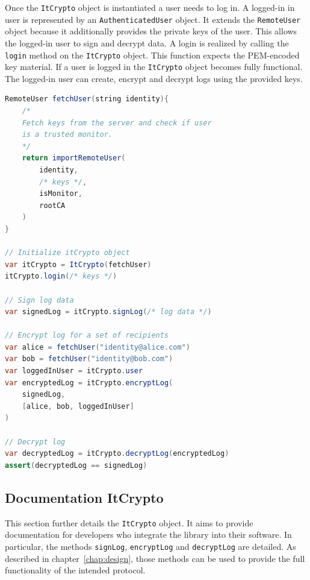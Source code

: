 \documentclass[../main.tex]{subfiles}
\begin{document}
Once the \verb|ItCrypto| object is instantiated a user needs to log in.
A logged-in in user is represented by an \verb|AuthenticatedUser| object.
It extends the \verb|RemoteUser| object because it additionally provides the private keys of the user.
This allows the logged-in user to sign and decrypt data.
A login is realized by calling the \verb|login| method on the \verb|ItCrypto| object.
This function expects the PEM-encoded key material.
If a user is logged in the \verb|ItCrypto| object becomes fully functional.
The logged-in user can create, encrypt and decrypt logs using the provided keys.

\begin{lstlisting}[basicstyle=\small, label=lst:pseudocode,float,floatplacement=tbp, language=Java, caption={Pseudocode of creating, encrypting and decrypting logs using the provided libraries.}, morekeywords={RemoteUser, var, assert}, commentstyle=\color{codegreen}]
RemoteUser fetchUser(string identity){
    /*
    Fetch keys from the server and check if user 
    is a trusted monitor.
    */
    return importRemoteUser(
        identity,
        /* keys */, 
        isMonitor, 
        rootCA
    )
}

// Initialize itCrypto object
var itCrypto = ItCrypto(fetchUser)
itCrypto.login(/* keys */)

// Sign log data
var signedLog = itCrypto.signLog(/* log data */)

// Encrypt log for a set of recipients
var alice = fetchUser("identity@alice.com")
var bob = fetchUser("identity@bob.com")
var loggedInUser = itCrypto.user
var encryptedLog = itCrypto.encryptLog(
    signedLog, 
    [alice, bob, loggedInUser]
)

// Decrypt log
var decryptedLog = itCrypto.decryptLog(encryptedLog)
assert(decryptedLog == signedLog)
\end{lstlisting}

\subsection{Documentation ItCrypto}
This section further details the \verb|ItCrypto| object.
It aims to provide documentation for developers who integrate the library into their software.
In particular, the methods \verb|signLog|, \verb|encryptLog| and \verb|decryptLog| are detailed.
As described in chapter~\ref{chap:design}, those methods can be used to provide the full functionality of the intended protocol.
\end{document}
